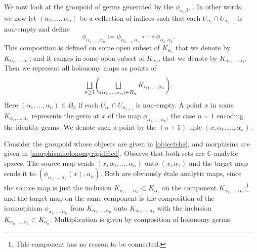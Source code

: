\documentclass[10pt]{amsart}
\let\oldbigsqcup\bigsqcup
\renewcommand{\bigsqcup}{\mathop{\textstyle\oldbigsqcup}\displaylimits}
\theoremstyle{plain}
\theoremstyle{definition}
\theoremstyle{remark}
\numberwithin{equation}{section}
\newcommand{\CC}{{\mathbb{C}}}
\let\uniondisjointe\bigsqcup
\begin{document}
We now look at the groupoid of germs generated by the $\phi_{\alpha,\beta}$, \cf \cite[1.2]{Ha}. In other words, we now let $(\alpha_1,\hdots,\alpha_n)$ be a collection of indices such that each $U_{\alpha_i}\cap U_{\alpha_{i+1}}$ is non-empty and define\vspace*{-3pt}
\begin{equation}
\label{phialpha1n}
\phi_{\alpha_1,\hdots,\alpha_n}:=\phi_{\alpha_{n-1},\alpha_n}\circ\cdots\circ \phi_{\alpha_1,\alpha_2}.
\end{equation}
This composition is defined on some open subset of $K_{\alpha_1}$ that we denote by $K_{\alpha_1,\hdots,\alpha_n}$; and it ranges in some open subset of $K_{\alpha_n}$, that we denote by $K_{\alpha_n,\hdots, \alpha_1}$. Then we represent all holonomy maps as
points of
\begin{equation}
\label{morphismholonomyrigidified}
\uniondisjointe_{n\geq 1}\biggl (\uniondisjointe_{(\alpha_1,\hdots,\alpha_n) \in B_{n}} K_{\alpha_1,\hdots,\alpha_n}\biggr ).
\end{equation}
Here $(\alpha_1,\hdots,\alpha_n) \in B_{n}$ if each $U_{\alpha_i}\cap U_{\alpha_{i+1}}$ is non-empty.
A point $x$ in some $K_{\alpha_1,\hdots,\alpha_n}$ represents the germ at $x$ of the map $\phi_{\alpha_1,\hdots,\alpha_n}$, the case $n=1$ encoding the identity
germs. We denote such a point by the $(n+1)$-uple $(x,\alpha_1,\hdots,\alpha_n)$.

Consider the groupoid whose objects are given in \eqref{objectshg}, and morphisms are given in \eqref{morphismholonomyrigidified}. Observe that both sets are $\CC$-analytic spaces. The source map sends $(x,\alpha_1,\hdots, \alpha_n)$ onto $(x,\alpha_1)$ and the target map sends it to $(\phi_{\alpha_1,\hdots,\alpha_n}(x),\alpha_n)$. Both are obviously étale analytic maps, since the source map is just the inclusion $K_{\alpha_1,\hdots,\alpha_n}\subset K_{\alpha_1}$ on the component $K_{\alpha_1,\hdots,\alpha_n}$;\footnote{This component has no reason to be connected.} and the target map on the same component is the composition of the isomorphism $\phi_{\alpha_1,\hdots,\alpha_n}$ from $K_{\alpha_1,\hdots,\alpha_n}$ onto $K_{\alpha_n,\hdots,\alpha_1}$ with the inclusion $K_{\alpha_n,\hdots,\alpha_1}\subset K_{\alpha_n}$. Multiplication is given by composition of holonomy germs.
\end{document}

